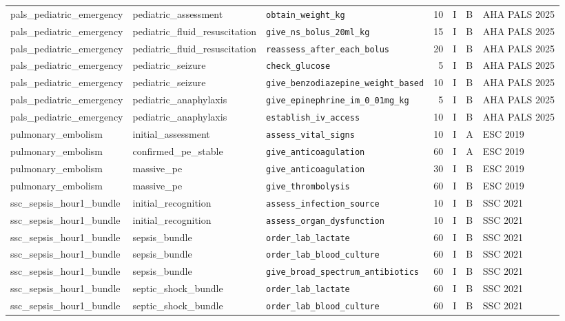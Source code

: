 \begin{longtable}{lllrrll}
pals\_pediatric\_emergency & pediatric\_assessment & \texttt{obtain\_weight\_kg} & 10 & I & B & AHA PALS 2025 \\
pals\_pediatric\_emergency & pediatric\_fluid\_resuscitation & \texttt{give\_ns\_bolus\_20ml\_kg} & 15 & I & B & AHA PALS 2025 \\
pals\_pediatric\_emergency & pediatric\_fluid\_resuscitation & \texttt{reassess\_after\_each\_bolus} & 20 & I & B & AHA PALS 2025 \\
pals\_pediatric\_emergency & pediatric\_seizure & \texttt{check\_glucose} & 5 & I & B & AHA PALS 2025 \\
pals\_pediatric\_emergency & pediatric\_seizure & \texttt{give\_benzodiazepine\_weight\_based} & 10 & I & B & AHA PALS 2025 \\
pals\_pediatric\_emergency & pediatric\_anaphylaxis & \texttt{give\_epinephrine\_im\_0\_01mg\_kg} & 5 & I & B & AHA PALS 2025 \\
pals\_pediatric\_emergency & pediatric\_anaphylaxis & \texttt{establish\_iv\_access} & 10 & I & B & AHA PALS 2025 \\
pulmonary\_embolism & initial\_assessment & \texttt{assess\_vital\_signs} & 10 & I & A & ESC 2019 \\
pulmonary\_embolism & confirmed\_pe\_stable & \texttt{give\_anticoagulation} & 60 & I & A & ESC 2019 \\
pulmonary\_embolism & massive\_pe & \texttt{give\_anticoagulation} & 30 & I & B & ESC 2019 \\
pulmonary\_embolism & massive\_pe & \texttt{give\_thrombolysis} & 60 & I & B & ESC 2019 \\
ssc\_sepsis\_hour1\_bundle & initial\_recognition & \texttt{assess\_infection\_source} & 10 & I & B & SSC 2021 \\
ssc\_sepsis\_hour1\_bundle & initial\_recognition & \texttt{assess\_organ\_dysfunction} & 10 & I & B & SSC 2021 \\
ssc\_sepsis\_hour1\_bundle & sepsis\_bundle & \texttt{order\_lab\_lactate} & 60 & I & B & SSC 2021 \\
ssc\_sepsis\_hour1\_bundle & sepsis\_bundle & \texttt{order\_lab\_blood\_culture} & 60 & I & B & SSC 2021 \\
ssc\_sepsis\_hour1\_bundle & sepsis\_bundle & \texttt{give\_broad\_spectrum\_antibiotics} & 60 & I & B & SSC 2021 \\
ssc\_sepsis\_hour1\_bundle & septic\_shock\_bundle & \texttt{order\_lab\_lactate} & 60 & I & B & SSC 2021 \\
ssc\_sepsis\_hour1\_bundle & septic\_shock\_bundle & \texttt{order\_lab\_blood\_culture} & 60 & I & B & SSC 2021 \\

\end{longtable}
